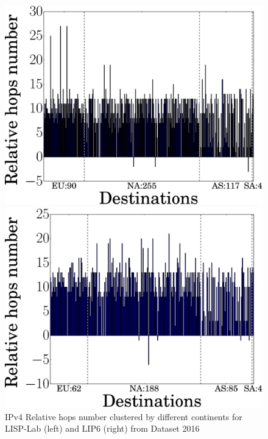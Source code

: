 \begin{figure}[!t]
	\begin{minipage}[c]{.49\linewidth}
		\begin{center}
			\includegraphics[width=\textwidth]{Pics/v4/Relative_hops_num_LISP-Lab-FranceIX_changed_60.eps}
		\end{center}
	\end{minipage}
	\begin{minipage}[c]{.49\linewidth}
		\begin{center}
			\includegraphics[width=\textwidth]{Pics/v4/Relative_hops_num_LIP6-FranceIX_changed_60.eps}
		\end{center}
	\end{minipage}
	\vspace{-0.5mm}
	\caption{IPv4 Relative hops number clustered by different continents for LISP-Lab (left) and LIP6 (right) from Dataset 2016}
	\label{v4_Relative_hops_num}
\end{figure}

